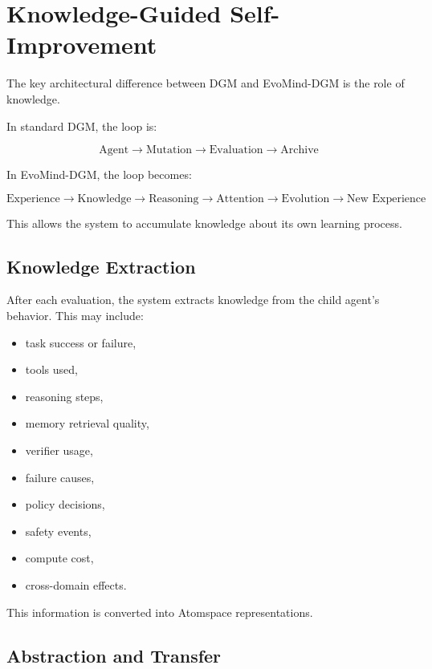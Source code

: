 \documentclass[11pt]{article}
\begin{document}
\section{Knowledge-Guided Self-Improvement}

The key architectural difference between DGM and EvoMind-DGM is the role of knowledge.

In standard DGM, the loop is:

\begin{equation}
\text{Agent} \rightarrow \text{Mutation} \rightarrow \text{Evaluation} \rightarrow \text{Archive}
\end{equation}

In EvoMind-DGM, the loop becomes:

\begin{equation}
\text{Experience} \rightarrow \text{Knowledge} \rightarrow \text{Reasoning} \rightarrow \text{Attention} \rightarrow \text{Evolution} \rightarrow \text{New Experience}
\end{equation}

This allows the system to accumulate knowledge about its own learning process.

\subsection{Knowledge Extraction}

After each evaluation, the system extracts knowledge from the child agent's behavior. This may include:

\begin{itemize}[leftmargin=*]
    \item task success or failure,
    \item tools used,
    \item reasoning steps,
    \item memory retrieval quality,
    \item verifier usage,
    \item failure causes,
    \item policy decisions,
    \item safety events,
    \item compute cost,
    \item cross-domain effects.
\end{itemize}

This information is converted into Atomspace representations.

\subsection{Abstraction and Transfer}
\end{document}
